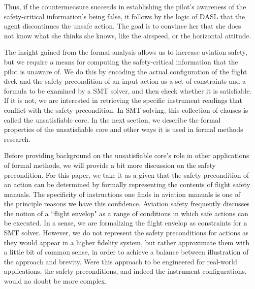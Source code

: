 Thus, if the countermeasure succeeds in establishing the pilot's awareness of the safety-critical information's being false, it follows by the logic of DASL that the agent discontinues the unsafe action. The goal is to convince her that she does not know what she thinks she knows, like the airspeed, or the horizontal attitude.

The insight gained from the formal analysis allows us to increase aviation safety, but we require a means for computing the safety-critical information that the pilot is unaware of. We do this by encoding the actual configuration of the flight deck and the safety precondition of an input action as a set of constraints and a formula to be examined by a SMT solver, and then check whether it is satisfiable. If it is not, we are interested in retrieving the specific instrument readings that conflict with the safety precondition. In SMT solving, this collection of clauses is called the unsatisfiable core. In the next section, we describe the formal properties of the unsatisfiable core and other ways it is used in formal methods research.

Before providing background on the unsatisfiable core's role in other applications of formal methods, we will provide a bit more discussion on the safety precondition. For this paper, we take it as a given that the safety precondition of an action can be determined by formally representing the contents of flight safety manuals. The specificity of instructions one finds in aviation manuals is one of the principle reasons we have this confidence. Aviation safety frequently discusses the notion of a ``flight envelop" as a range of conditions in which safe actions can be executed. In a sense, we are formalizing the flight envelop as constraints for a SMT solver. However, we do not represent the safety preconditions for actions as they would appear in a higher fidelity system, but rather approximate them with a little bit of common sense, in order to achieve a balance between illustration of the approach and brevity. Were this approach to be engineered for real-world applications, the safety preconditions, and indeed the instrument configurations, would no doubt be more complex.

